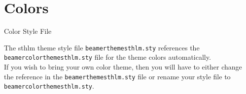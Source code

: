 \documentclass[newPxFont,numfooter,sectionpages]{beamer}
\begin{document}
\section{Colors}


\begin{frame}[c]{Color Style File}
	
The sthlm theme style file \texttt{beamerthemesthlm.sty} references the \texttt{beamercolorthemesthlm.sty} file for the theme colors automatically. \\
\vspace{1em}
If you wish to bring your own color theme, then you will have to either change the reference in the \texttt{beamerthemesthlm.sty} file or rename your style file to \texttt{beamercolorthemesthlm.sty}.

\end{frame}

\end{document}
